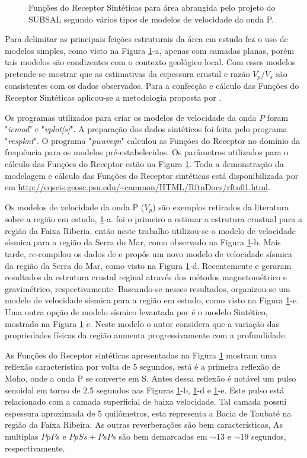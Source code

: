 \begin{figure}[!ht]
\caption{Funções do Receptor Sintéticas para área abrangida pelo projeto do SUBSAL segundo vários tipos de modelos de velocidade da onda P.}
\label{modelagem}
\end{figure}

Para delimitar as principais feições estruturais da área em estudo fez o uso de modelos simples, como visto na Figura \ref{modelagem}-a, apenas com camadas planas, porém tais modelos são condizentes com o contexto geológico local. Com esses modelos pretende-se mostrar que as estimativas da espessura crustal e razão $V_{p}/V_{s}$ são consistentes com os dados observados. Para a confecção e cálculo das Funções do Receptor Sintéticas aplicou-se a metodologia proposta por \cite{Ammon_waterlevel_1997}. 

Os programas utilizados para criar os modelos de velocidade da onda $P$ foram "\textit{icmod}" e "\textit{vplot[s]}". A preparação dos dados sintéticos foi feita pelo programa "\textit{respknt}". O programa "\textit{pwaveqn}" calculou as Funções do Receptor no domínio da frequência para os modelos pré-estabelecidos. Os parâmetros utilizados para o cálculo das Funções do Receptor estão na Figura \ref{modelagem}. Toda a demonstração da modelagem e cálculo das Funções do Receptor sintéticas está disponibilizada por \cite{Ammon_waterlevel_1997} em \url{http://eqseis.geosc.psu.edu/~cammon/HTML/RftnDocs/rftn01.html}.

Os modelos de velocidade da onda P ($V_{p}$) são exemplos retirados da literatura sobre a região em estudo, \ref{modelagem}-a. \cite{Bassini_1986} foi o primeiro a estimar a estrutura crustual para a região da Faixa Riberia, então neste trabalho utilizou-se o modelo de velocidade sísmica para a região da Serra do Mar, como observado na Figura \ref{modelagem}-b. Mais tarde, \cite{sand_franca_crustal_2004} re-compilou os dados de \cite{Bassini_1986} e propôs um novo modelo de velocidade sísmica da região da Serra do Mar, como visto na Figura \ref{modelagem}-d. Recentemente \cite{flora_solon_ancient_2013} e \cite{Silva_2014} geraram resultados da estrutura crustal reginal através dos métodos magnetométrico e gravimétrico, respectivamente. Baseando-se nesses resultados, organizou-se um modelo de velocidade sísmica para a região em estudo, como visto na Figura \ref{modelagem}-e. Uma outra opção de modelo sísmico levantada por \cite{sand_franca_crustal_2004} é o modelo Sintético, mostrado na Figura \ref{modelagem}-c. Neste modelo o autor considera que a variação das propriedades físicas da região aumenta progressivamente com a profundidade.

As Funções do Receptor sintéticas apresentadas na Figura \ref{modelagem} mostram uma reflexão característica por volta de 5 segundos, está é a primeira reflexão de Moho, onde a onda P se converte em S. Antes dessa reflexão é notável um pulso senoidal em torno de 2.5 segundos nas Figuras \ref{modelagem}-b, \ref{modelagem}-d e \ref{modelagem}-e. Este pulso está relacionado com a camada superficial de baixa velocidade. Tal camada possui espessura aproximada de 5 quilômetros, esta representa a Bacia de Taubaté na região da Faixa Ribeira. As outras reverberações são bem características, As multiplas $PpPs$ e $PpSs+PsPs$ são bem demarcadas em $\sim 13$ e $\sim 19$ segundos, respectivamente.